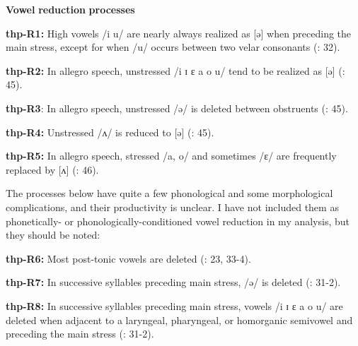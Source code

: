\documentclass[output=paper]{langsci/langscibook}
\begin{document}
\begin{styleBody}
\textbf{Vowel} \textbf{reduction} \textbf{processes}
\end{styleBody}

\begin{styleBody}
\textbf{thp-R1:} High vowels /i u/ are nearly always realized as [ə] when preceding the main stress, except for when /u/ occurs between two velar consonants (\citealt{ThompsonThompson1992}: 32).
\end{styleBody}

\begin{styleBody}
\textbf{thp-R2:} In allegro speech, unstressed /i ɪ ɛ a o u/ tend to be realized as [ə] (\citealt{ThompsonThompson1992}: 45).
\end{styleBody}

\begin{styleBody}
\textbf{thp-R3}: In allegro speech, unstressed /ə/ is deleted between obstruents (\citealt{ThompsonThompson1992}: 45).
\end{styleBody}

\begin{styleBody}
\textbf{thp-R4:} Unstressed /ʌ/ is reduced to [ə] (\citealt{ThompsonThompson1992}: 45).
\end{styleBody}

\begin{styleBody}
\textbf{thp-R5:} In allegro speech, stressed /a, o/ and sometimes /ɛ/ are frequently replaced by [ʌ] (\citealt{ThompsonThompson1992}: 46).
\end{styleBody}

\begin{styleBody}
The processes below have quite a few phonological and some morphological complications, and their productivity is unclear. I have not included them as phonetically- or phonologically-conditioned vowel reduction in my analysis, but they should be noted:
\end{styleBody}

\begin{styleBody}
\textbf{thp-R6:} Most post-tonic vowels are deleted (\citealt{ThompsonThompson1992}: 23, 33-4).
\end{styleBody}

\begin{styleBody}
\textbf{thp-R7:} In successive syllables preceding main stress, /ə/ is deleted (\citealt{ThompsonThompson1992}: 31-2).
\end{styleBody}

\begin{styleBody}
\textbf{thp-R8:} In successive syllables preceding main stress, vowels /i ɪ ɛ a o u/ are deleted when adjacent to a laryngeal, pharyngeal, or homorganic semivowel and preceding the main stress (\citealt{ThompsonThompson1992}: 31-2).
\end{styleBody}
\end{document}
